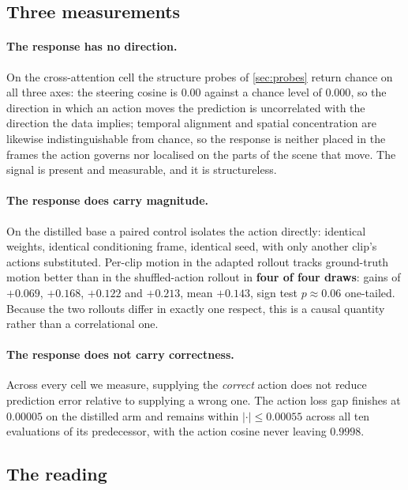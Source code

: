 \subsection{Three measurements}

\paragraph{The response has no direction.} On the cross-attention cell the
structure probes of \cref{sec:probes} return chance on all three axes: the
steering cosine is $0.00$ against a chance level of $0.000$, so the
direction in which an action moves the prediction is uncorrelated with the
direction the data implies; temporal alignment and spatial concentration are
likewise indistinguishable from chance, so the response is neither placed in
the frames the action governs nor localised on the parts of the scene that
move.
The signal is present and measurable, and it is structureless.

\paragraph{The response does carry magnitude.} On the distilled base a
paired control isolates the action directly: identical weights, identical
conditioning frame, identical seed, with only another clip's actions
substituted. Per-clip motion in the adapted rollout tracks ground-truth
motion better than in the shuffled-action rollout in \textbf{four of four
draws}: gains of $+0.069$, $+0.168$, $+0.122$ and $+0.213$, mean
$+0.143$, sign test $p \approx 0.06$ one-tailed.
Because the two rollouts differ in exactly one respect, this is a causal
quantity rather than a correlational one.

\paragraph{The response does not carry correctness.} Across every cell we
measure, supplying the \emph{correct} action does not reduce prediction
error relative to supplying a wrong one. The action loss gap finishes at
$0.00005$ on the distilled arm and remains within $|{\cdot}| \leq 0.00055$
across all ten evaluations of its predecessor, with the action cosine never
leaving $0.9998$.

\subsection{The reading}

